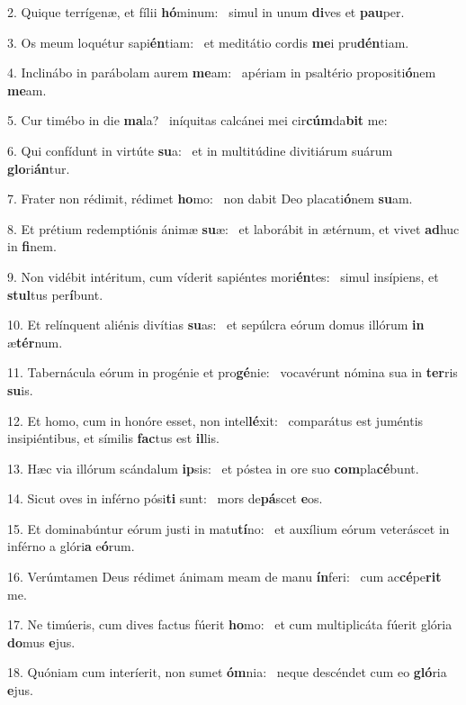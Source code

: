 2. Quique terrígenæ, et fílii \textbf{hó}minum: \ast\  simul in unum \textbf{di}ves et \textbf{pau}per.\

3. Os meum loquétur sapi\textbf{én}tiam: \ast\  et meditátio cordis \textbf{me}i pru\textbf{dén}tiam.\

4. Inclinábo in parábolam aurem \textbf{me}am: \ast\  apériam in psaltério propositi\textbf{ó}nem \textbf{me}am.\

5. Cur timébo in die \textbf{ma}la? \ast\  iníquitas calcánei mei cir\textbf{cúm}da\textbf{bit} me:\

6. Qui confídunt in virtúte \textbf{su}a: \ast\  et in multitúdine divitiárum suárum \textbf{glo}ri\textbf{án}tur.\

7. Frater non rédimit, rédimet \textbf{ho}mo: \ast\  non dabit Deo placati\textbf{ó}nem \textbf{su}am.\

8. Et prétium redemptiónis ánimæ \textbf{su}æ: \ast\  et laborábit in ætérnum, et vivet \textbf{ad}huc in \textbf{fi}nem.\

9. Non vidébit intéritum, cum víderit sapiéntes mori\textbf{én}tes: \ast\  simul insípiens, et \textbf{stul}tus per\textbf{í}bunt.\

10. Et relínquent aliénis divítias \textbf{su}as: \ast\  et sepúlcra eórum domus illórum \textbf{in} æ\textbf{tér}num.\

11. Tabernácula eórum in progénie et pro\textbf{gé}nie: \ast\  vocavérunt nómina sua in \textbf{ter}ris \textbf{su}is.\

12. Et homo, cum in honóre esset, non intel\textbf{lé}xit: \ast\  comparátus est juméntis insipiéntibus, et símilis \textbf{fac}tus est \textbf{il}lis.\

13. Hæc via illórum scándalum \textbf{ip}sis: \ast\  et póstea in ore suo \textbf{com}pla\textbf{cé}bunt.\

14. Sicut oves in inférno pósi\textbf{ti} sunt: \ast\  mors de\textbf{pá}scet \textbf{e}os.\

15. Et dominabúntur eórum justi in matu\textbf{tí}no: \ast\  et auxílium eórum veteráscet in inférno a glóri\textbf{a} e\textbf{ó}rum.\

16. Verúmtamen Deus rédimet ánimam meam de manu \textbf{ín}feri: \ast\  cum ac\textbf{cé}pe\textbf{rit} me.\

17. Ne timúeris, cum dives factus fúerit \textbf{ho}mo: \ast\  et cum multiplicáta fúerit glória \textbf{do}mus \textbf{e}jus.\

18. Quóniam cum interíerit, non sumet \textbf{óm}nia: \ast\  neque descéndet cum eo \textbf{gló}ria \textbf{e}jus.\

